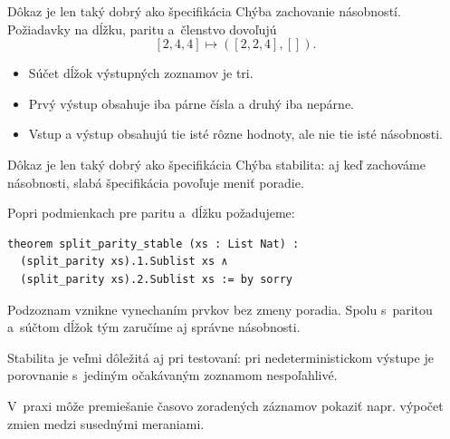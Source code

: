 \documentclass[12pt]{beamer}
\begin{document}
\begin{frame}{Dôkaz je len taký dobrý ako špecifikácia}
Chýba zachovanie násobností. Požiadavky na dĺžku, paritu a~členstvo dovoľujú
\[
  [2,4,4] \longmapsto ([2,2,4],[]).
\]
\begin{itemize}
    \item Súčet dĺžok výstupných zoznamov je tri.
    \item Prvý výstup obsahuje iba párne čísla a druhý iba nepárne.
    \item Vstup a výstup obsahujú tie isté rôzne hodnoty, ale nie tie isté násobnosti.
\end{itemize}
\end{frame}

\begin{frame}[fragile]{Dôkaz je len taký dobrý ako špecifikácia}
Chýba stabilita: aj keď zachováme násobnosti, slabá špecifikácia povoľuje meniť poradie.

Popri podmienkach pre paritu a~dĺžku požadujeme:
\begin{lstlisting}[language=Lean,basicstyle=\scriptsize\ttfamily]
theorem split_parity_stable (xs : List Nat) :
  (split_parity xs).1.Sublist xs ∧
  (split_parity xs).2.Sublist xs := by sorry
\end{lstlisting}
Podzoznam vznikne vynechaním prvkov bez zmeny poradia.
Spolu s~paritou a~súčtom dĺžok tým zaručíme aj správne násobnosti.

\medskip
Stabilita je veľmi dôležitá aj pri testovaní: pri nedeterministickom
výstupe je porovnanie s~jediným očakávaným zoznamom nespoľahlivé.

V~praxi môže premiešanie časovo zoradených záznamov pokaziť
napr. výpočet zmien medzi susednými meraniami.
\end{frame}
\end{document}
